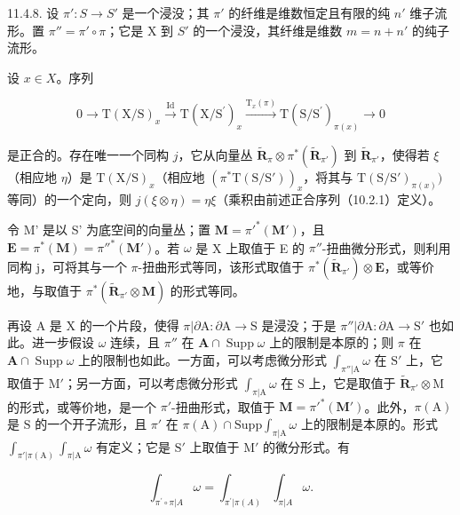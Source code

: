 11.4.8. 设 \(\pi': S \to S'\) 是一个浸没；其 \(\pi'\) 的纤维是维数恒定且有限的纯 \(n'\) 维子流形。置 \(\pi'' = \pi' \circ \pi\)；它是 X 到 \(S'\) 的一个浸没，其纤维是维数 \(m = n + n'\) 的纯子流形。

设 \(x\in X\)。序列

\[
0 \longrightarrow \mathrm{T} (\mathrm{X} / \mathrm{S}) _ {x} \stackrel {\mathrm{Id}} {\longrightarrow} \mathrm{T} (\mathrm{X} / \mathrm{S} ^ {\prime}) _ {x} \stackrel {\mathrm{T} _ {x} (\pi)} {\longrightarrow} \mathrm{T} (\mathrm{S} / \mathrm{S} ^ {\prime}) _ {\pi (x)} \longrightarrow 0
\]

是正合的。存在唯一一个同构 \(j\)，它从向量丛 \(\tilde{\mathbf{R}}_{\pi} \otimes \pi^{*}(\tilde{\mathbf{R}}_{\pi'})\) 到 \(\tilde{\mathbf{R}}_{\pi'}\)，使得若 \(\xi\)（相应地 \(\eta\)）是 \(\mathrm{T}(\mathrm{X}/\mathrm{S})_x\)（相应地 \((\pi^{*}\mathrm{T}(\mathrm{S}/\mathrm{S}'))_x\)，将其与 \(\mathrm{T}(\mathrm{S}/\mathrm{S}')_{\pi(x)})\) 等同）的一个定向，则 \(j(\xi \otimes \eta) = \eta\xi\)（乘积由前述正合序列（10.2.1）定义）。

令 M' 是以 S' 为底空间的向量丛；置 \(\mathbf{M} = \pi'^{*}(\mathbf{M}')\)，且 \(\mathbf{E}=\pi^{*}(\mathbf{M})=\pi''^{*}(\mathbf{M}')\)。若 \(\omega\) 是 X 上取值于 E 的 \(\pi''\)-扭曲微分形式，则利用同构 j，可将其与一个 \(\pi\)-扭曲形式等同，该形式取值于 \(\pi^{*}(\tilde{\mathbf{R}}_{\pi'}) \otimes \mathbf{E}\)，或等价地，与取值于 \(\pi^{*}(\tilde{\mathbf{R}}_{\pi'} \otimes \mathbf{M})\) 的形式等同。

再设 A 是 X 的一个片段，使得 \(\pi|\partial\mathrm{A}:\partial\mathrm{A}\to\mathrm{S}\) 是浸没；于是 \(\pi''|\partial\mathrm{A}:\partial\mathrm{A}\to\mathrm{S}'\) 也如此。进一步假设 \(\omega\) 连续，且 \(\pi''\) 在 \(\mathbf{A}\cap\operatorname{Supp}\omega\) 上的限制是本原的；则 \(\pi\) 在 \(\mathbf{A}\cap\operatorname{Supp}\omega\) 上的限制也如此。一方面，可以考虑微分形式 \(\int_{\pi''|\mathrm{A}}\omega\) 在 \(\mathrm{S}'\) 上，它取值于 \(\mathrm{M}'\)；另一方面，可以考虑微分形式 \(\int_{\pi|\mathrm{A}}\omega\) 在 \(\mathrm{S}\) 上，它是取值于 \(\tilde{\mathbf{R}}_{\pi'}\otimes\mathrm{M}\) 的形式，或等价地，是一个 \(\pi'\)-扭曲形式，取值于 \(\mathbf{M}=\pi'^{*}(\mathbf{M}')\)。此外，\(\pi(\mathrm{A})\) 是 \(\mathrm{S}\) 的一个开子流形，且 \(\pi'\) 在 \(\pi(\mathrm{A})\cap\mathrm{Supp}\int_{\pi|\mathrm{A}}\omega\) 上的限制是本原的。形式 \(\int_{\pi'|\pi(\mathrm{A})}\int_{\pi|\mathrm{A}}\omega\) 有定义；它是 \(\mathrm{S}'\) 上取值于 \(\mathrm{M}'\) 的微分形式。有

\[
\int_ {\pi^ {\prime} \circ \pi | A} \omega = \int_ {\pi^ {\prime} | \pi (A)} \int_ {\pi | A} \omega .
\]

